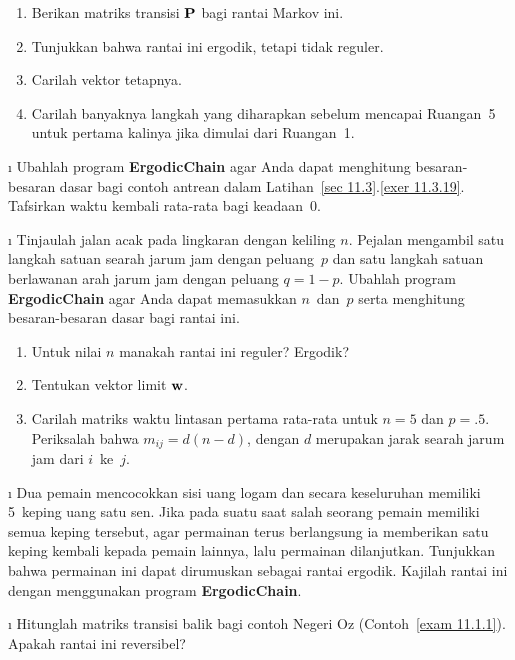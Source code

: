 \begin{LJSItem}
\begin{enumerate}
\item Berikan matriks transisi ${\mbox{\bf P}\/}$ bagi rantai Markov ini.

\item Tunjukkan bahwa rantai ini ergodik, tetapi tidak reguler.

\item Carilah vektor tetapnya.

\item Carilah banyaknya langkah yang diharapkan sebelum mencapai Ruangan~5 untuk
pertama kalinya jika dimulai dari Ruangan~1.
\end{enumerate}

\i\label{exer 11.5.8} Ubahlah program {\bf  ErgodicChain} agar Anda dapat
menghitung besaran-besaran dasar bagi contoh antrean dalam Latihan~\ref{sec
11.3}.\ref{exer 11.3.19}. Tafsirkan waktu kembali rata-rata bagi keadaan~0.

\i\label{exer 11.5.9} Tinjaulah jalan acak pada lingkaran dengan keliling $n$.
Pejalan mengambil satu langkah satuan searah jarum jam dengan peluang~$p$ dan
satu langkah satuan berlawanan arah jarum jam dengan peluang $q = 1 - p$.
Ubahlah program {\bf  ErgodicChain} agar Anda dapat memasukkan $n$~dan~$p$ serta
menghitung besaran-besaran dasar bagi rantai ini.
\begin{enumerate}

\item Untuk nilai $n$ manakah rantai ini reguler? Ergodik?

\item Tentukan vektor limit ${\mbox{\bf w}\/}$.

\item Carilah matriks waktu lintasan pertama rata-rata untuk $n = 5$ dan
$p = .5$. Periksalah bahwa $m_{ij} = d(n - d)$, dengan $d$ merupakan jarak
searah jarum jam dari $i$~ke~$j$.
\end{enumerate}
 
\i\label{exer 11.5.10} Dua pemain mencocokkan sisi uang logam dan secara
keseluruhan memiliki 5~keping uang satu sen. Jika pada suatu saat salah seorang
pemain memiliki semua keping tersebut, agar permainan terus berlangsung ia
memberikan satu keping kembali kepada pemain lainnya, lalu permainan dilanjutkan.
Tunjukkan bahwa permainan ini dapat dirumuskan sebagai rantai ergodik. Kajilah
rantai ini dengan menggunakan program {\bf  ErgodicChain}.

\i\label{exer 11.5.11} Hitunglah matriks transisi balik bagi contoh Negeri Oz
(Contoh~\ref{exam 11.1.1}). Apakah rantai ini reversibel?


\end{LJSItem}
